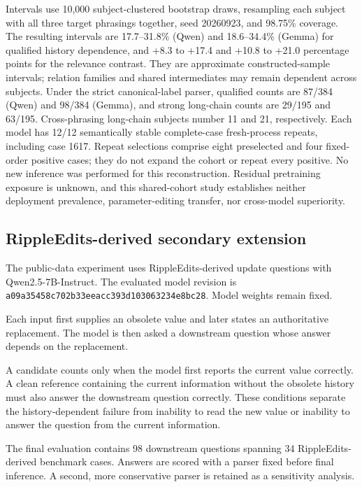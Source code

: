 \documentclass{article}
\begin{document}
Intervals use 10,000 subject-clustered bootstrap draws, resampling each subject with all three target phrasings together, seed 20260923, and 98.75\% coverage. The resulting intervals are 17.7--31.8\% (Qwen) and 18.6--34.4\% (Gemma) for qualified history dependence, and +8.3 to +17.4 and +10.8 to +21.0 percentage points for the relevance contrast. They are approximate constructed-sample intervals; relation families and shared intermediates may remain dependent across subjects. Under the strict canonical-label parser, qualified counts are 87/384 (Qwen) and 98/384 (Gemma), and strong long-chain counts are 29/195 and 63/195. Cross-phrasing long-chain subjects number 11 and 21, respectively. Each model has 12/12 semantically stable complete-case fresh-process repeats, including case 1617. Repeat selections comprise eight preselected and four fixed-order positive cases; they do not expand the cohort or repeat every positive. No new inference was performed for this reconstruction. Residual pretraining exposure is unknown, and this shared-cohort study establishes neither deployment prevalence, parameter-editing transfer, nor cross-model superiority.

\subsection{RippleEdits-derived secondary extension}

The public-data experiment uses RippleEdits-derived update questions with
Qwen2.5-7B-Instruct. The evaluated model revision is
\texttt{a09a35458c702b33eeacc393d103063234e8bc28}. Model weights remain fixed.

Each input first supplies an obsolete value and later states an authoritative
replacement. The model is then asked a downstream question whose answer
depends on the replacement.

A candidate counts only when the model first reports the current value
correctly. A clean reference containing the current information without the
obsolete history must also answer the downstream question correctly. These
conditions separate the history-dependent failure from inability to read the
new value or inability to answer the question from the current information.

The final evaluation contains 98 downstream questions spanning 34
RippleEdits-derived benchmark cases. Answers are scored with a parser fixed before final inference. A
second, more conservative parser is retained as a sensitivity analysis.
\end{document}
